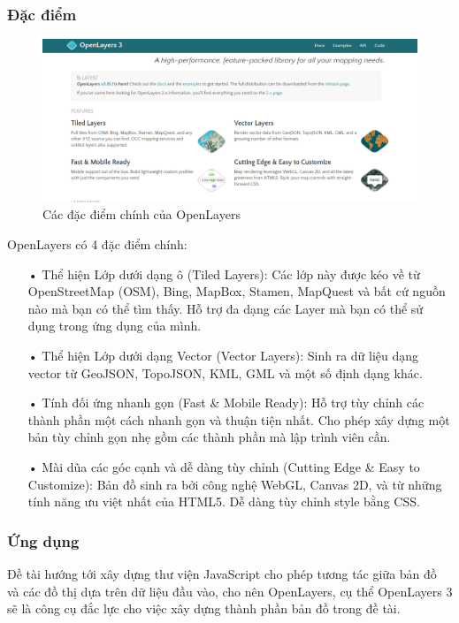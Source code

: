 \documentclass[12pt,a4paper]{article}
\begin{document}
\subsubsection{Đặc điểm}
    \begin{figure}[htp]
		\begin{center}
     	\includegraphics[scale=.4]{image/ol-feature}
    	\caption{Các đặc điểm chính của OpenLayers}
    	\label{refhinh15}
		\end{center}
    \end{figure}
OpenLayers có 4 đặc điểm chính:
\begin{itemize}
\item[•]Thể hiện Lớp dưới dạng ô (Tiled Layers): 
Các lớp này được kéo về từ OpenStreetMap (OSM), Bing, MapBox, Stamen, MapQuest và bất cứ nguồn nào mà bạn có thể tìm thấy. Hỗ trợ đa dạng các Layer mà bạn có thể sử dụng trong ứng dụng của mình.

\item[•]Thể hiện Lớp dưới dạng Vector (Vector Layers):
Sinh ra dữ liệu dạng vector từ GeoJSON, TopoJSON, KML, GML và một số định dạng khác.

\item[•]Tính đối ứng nhanh gọn (Fast \& Mobile Ready):
Hỗ trợ tùy chỉnh các thành phần một cách nhanh gọn và thuận tiện nhất. Cho phép xây dựng một bản tùy chỉnh gọn nhẹ gồm các thành phần mà lập trình viên cần.

\item[•]Mài dũa các góc cạnh và dễ dàng tùy chỉnh (Cutting Edge \& Easy to Customize):
Bản đồ sinh ra bởi công nghệ WebGL, Canvas 2D, và từ những tính năng ưu việt nhất của HTML5. Dễ dàng tùy chỉnh style bằng CSS.

\end{itemize}

\subsubsection{Ứng dụng}
Đề tài hướng tới xây dựng thư viện JavaScript cho phép tương tác giữa bản đồ và các đồ thị dựa trên dữ liệu đầu vào, cho nên OpenLayers, cụ thể OpenLayers 3 sẽ là công cụ đắc lực cho việc xây dựng thành phần bản đồ trong đề tài. 
\end{document}
